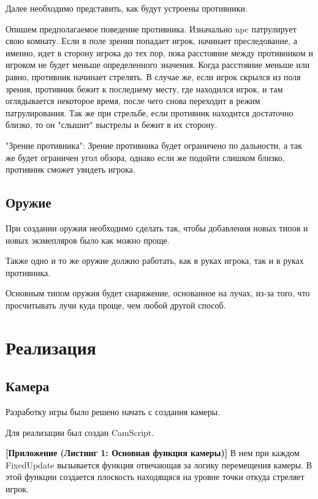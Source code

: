 \documentclass[14pt, titlepage,fleqn,a4paper]{extarticle}
\begin{document}
	Далее необходимо представить, как будут устроены противники.
	
	Опишем предполагаемое поведение противника.
	Изначально npc патрулирует свою комнату. Если в поле зрения попадает игрок, начинает преследование, а именно, идет в сторону игрока до тех пор, пока расстояние  между противником и игроком не будет меньше определенного значения. Когда расстояние меньше или равно, противник начинает стрелять. В случае же, если игрок скрылся из поля зрения, противник бежит к последнему месту, где находился игрок, и там оглядывается некоторое время, после чего снова переходит в режим патрулирования. Так же при стрельбе, если противник находится достаточно близко, то он "слышит" выстрелы и бежит в их сторону.

    "Зрение противника":
    Зрение противника будет ограничено по дальности, а так же будет ограничен угол обзора, однако если же подойти слишком близко, противник сможет увидеть игрока.

    
    \subsection*{Оружие}
	
	При создании оружия необходимо сделать так, чтобы добавления новых типов и новых экзмепляров было как можно проще.
	
	Также одно и то же оружие должно работать, как в руках игрока, так и в руках противника.
	
	Основным типом оружия будет снаряжение, основанное на лучах, из-за того, что просчитывать лучи куда проще, чем любой другой способ.
	
\newpage
    \section*{Реализация}
	\subsection*{Камера}
	Разработку игры было решено начать с создания камеры. 
	
	Для реализации был создан CamScript.

    \textbf{[Приложение (Листинг 1: Основная функция камеры)]}
    В нем при каждом FixedUpdate вызывается функция отвечающая за логику перемещения камеры. В этой функции создается плоскость находящяся на уровне точки откуда стреляет игрок. 
    
\end{document}
